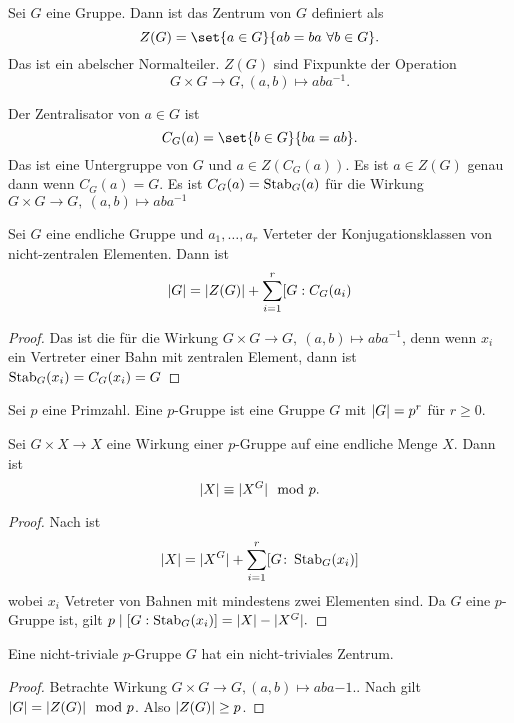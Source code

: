 \begin{Def}
    Sei \(G\) eine Gruppe. Dann ist das Zentrum von \(G\) definiert als
    \[Z(G)=\set{a\in G}{ab=ba\ \forall b\in G}.\] Das ist ein abelscher Normalteiler. \(Z(G)\) sind Fixpunkte der Operation \[G\times G\to G, (a,b)\mapsto aba^{-1}.\]
\end{Def}
\begin{Def}
    Der Zentralisator von \(a\in G\) ist \[C_G(a)=\set{b\in G}{ba=ab}.\] Das ist eine Untergruppe von \(G\) und \(a\in Z(C_G(a))\). Es ist \(a\in Z(G)\) genau dann wenn \(C_G(a)=G\). Es ist \(C_G(a)=\operatorname{Stab}_G(a)\) für die Wirkung \(G\times G\to G,\ (a,b)\mapsto aba^{-1}\)
\end{Def}
\begin{Satz}[Klassengleichung]\label{Satz:Klassengleichung}
    Sei \(G\) eine endliche Gruppe und \(a_1,\dots,a_r\) Verteter der Konjugationsklassen von nicht-zentralen Elementen. Dann ist 
    \[\lvert G\rvert=\lvert Z(G)\rvert+\sum_{i=1}^r[G:C_G(a_i)\]
\end{Satz}
\begin{proof}
    Das ist die  für die Wirkung \(G\times G\to G,\ (a,b)\mapsto aba^{-1}\), denn wenn \(x_i\) ein Vertreter einer Bahn mit zentralen Element, dann ist \(\operatorname{Stab}_G(x_i)=C_G(x_i)=G\)
\end{proof}
\begin{Def}
    Sei \(p\) eine Primzahl. Eine \(p\)-Gruppe ist eine Gruppe \(G\) mit \(\lvert G\rvert=p^r\) für \(r\geq 0\). 
\end{Def}
\begin{Satz}\label{Satz:FixpPGrp}
    Sei \(G\times X\to X\) eine Wirkung einer \(p\)-Gruppe auf eine endliche Menge \(X\). Dann ist 
    \[\lvert X\rvert\equiv \lvert X^G\rvert\mod p.\]
\end{Satz}
\begin{proof}
    Nach  ist 
    \[\lvert X\rvert=\lvert X^G\rvert+\sum_{i=1}^r[G\colon \operatorname{Stab}_G(x_i)]\] wobei \(x_i\) Vetreter von Bahnen mit mindestens zwei Elementen sind. Da \(G\) eine \(p\)-Gruppe ist, gilt 
    \(p\mid [G:\operatorname{Stab}_G(x_i)]=\lvert X\rvert-\lvert X^G\rvert.\)
\end{proof}
\begin{Satz}\label{Satz:pGrpZentrum}
    Eine nicht-triviale \(p\)-Gruppe \(G\) hat ein nicht-triviales Zentrum.
\end{Satz}
\begin{proof}
    Betrachte Wirkung \(G\times G\to G, (a,b)\mapsto aba{-1}.\). Nach  gilt \(\lvert G\rvert=\lvert Z(G)\rvert\mod p\). Also \(\lvert Z(G)\rvert\geq p\).
\end{proof}
